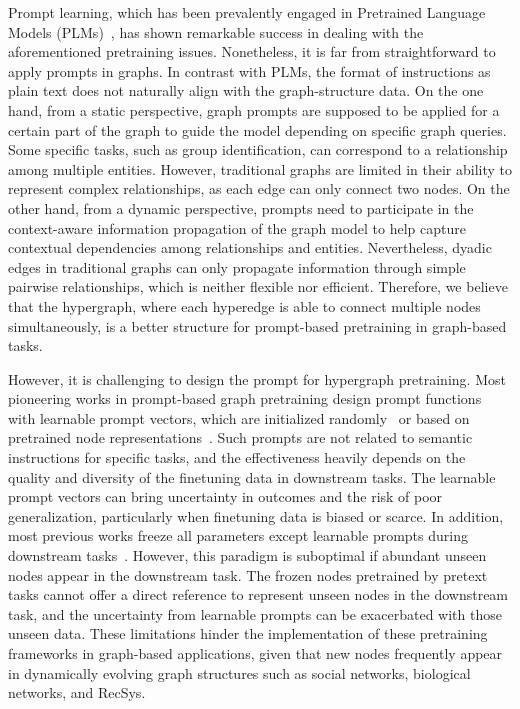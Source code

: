 Prompt learning, which has been prevalently engaged in Pretrained Language Models (PLMs)~\cite{promptsurveynlp, gpt3}, has shown remarkable success in dealing with the aforementioned pretraining issues.
Nonetheless, it is far from straightforward to apply prompts in graphs.  
In contrast with PLMs, the format of instructions as plain text does not naturally align with the graph-structure data.
On the one hand, from a static perspective, graph prompts are supposed to be applied for a certain part of the graph to guide the model depending on specific graph queries. Some
specific tasks, such as group identification, can correspond to a relationship among multiple entities. 
However, traditional graphs are limited in their ability to represent complex relationships, as each edge can only connect two nodes. 
On the other hand, from a dynamic perspective, prompts need to participate in the context-aware information propagation of the graph model to help capture contextual dependencies among relationships and entities.
Nevertheless, dyadic edges in traditional graphs can only propagate information through simple pairwise relationships, which is neither flexible nor efficient. 
Therefore, we believe that the hypergraph, where each hyperedge is able to connect multiple nodes~\cite{feng19, ZhouHS06} simultaneously, is a better structure for prompt-based pretraining in graph-based tasks.

 
However, it is challenging to design the prompt for hypergraph pretraining.
Most pioneering works in prompt-based graph pretraining design prompt functions with learnable prompt vectors, which are initialized randomly~\cite{allinone, graphprompt} or based on pretrained node representations~\cite{gppt}. 
Such prompts are not related to semantic instructions for specific tasks, and the effectiveness heavily depends on the quality and diversity of the finetuning data in downstream tasks. 
The learnable prompt vectors can bring uncertainty in outcomes and the risk of poor generalization, particularly when finetuning data is biased or scarce. 
In addition, most previous works freeze all parameters except learnable prompts during downstream tasks~\cite{allinone, graphprompt, gppt}. 
However, this paradigm is suboptimal if abundant unseen nodes appear in the downstream task. 
The frozen nodes pretrained by pretext tasks cannot offer a direct reference to represent unseen nodes in the downstream task, and the uncertainty from learnable prompts can be exacerbated with those unseen data.
These limitations hinder the implementation of these pretraining frameworks in graph-based applications, given that new nodes frequently appear in dynamically evolving graph structures such as social networks, biological networks, and RecSys.


